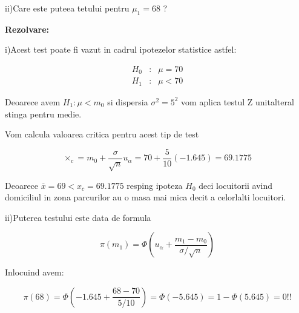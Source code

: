 \documentclass{article}
\begin{document}
ii)Care este puteea tetului pentru $\mu _{1}=68$ ?

\textbf{Rezolvare:}

i)Acest test poate fi vazut in cadrul ipotezelor statistice astfel:

\begin{eqnarray*}
H_{0} &:&\mu =70 \\
H_{1} &:&\mu <70
\end{eqnarray*}

Deoarece avem $H_{1}:\mu <m_{0}$ si dispersia $\sigma ^{2}=5^{2}$ vom aplica
testul Z unitalteral stinga pentru medie.

Vom calcula valoarea critica pentru acest tip de test

\[
\times _{c}=m_{0}+\frac{\sigma }{\sqrt{n}}u_{\alpha }=70+\frac{5}{10}%
(-1.645)=69.1775 
\]

Deoarece $\overline{x}=69<x_{c}=69.1775$ resping ipoteza $H_{0}$ deci
locuitorii avind domiciliul in zona parcurilor au o masa mai mica decit a
celorlalti locuitori.

ii)Puterea testului este data de formula

\[
\pi (m_{1})=\Phi \left( u_{\alpha }+\frac{m_{1}-m_{0}}{\sigma /\sqrt{n}}%
\right) 
\]

Inlocuind avem:

\[
\pi (68)=\Phi \left( -1.645+\frac{68-70}{5/10}\right) =\Phi (-5.645)=1-\Phi
(5.645)=0!! 
\]
\end{document}
